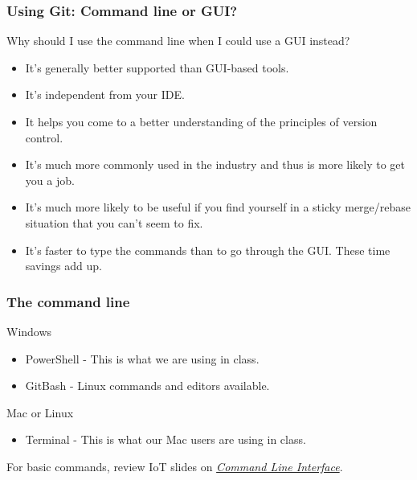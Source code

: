 \documentclass{beamer}
\begin{document}
\begin{frame}\frametitle{Using Git: Command line or GUI?}
Why should I use the command line when I could use a GUI instead?
\begin{itemize}
\item It's generally better supported than GUI-based tools.
\item It's independent from your IDE.
\item It helps you come to a better understanding of the principles of version control.
\item It's much more commonly used in the industry and thus is more likely to get you a job.
\item It's much more likely to be useful if you find yourself in a sticky merge/rebase situation that you can't seem to fix.
\item It’s faster to type the commands than to go through the GUI. These time savings add up.
\end{itemize}
\end{frame}

\begin{frame}\frametitle{The command line}
Windows
\begin{itemize}
\item PowerShell - \color{red}This is what we are using in class.\color{black}
\item GitBash - Linux commands and editors available.
\end{itemize}
\vspace{1cm}
Mac or Linux
\begin{itemize}
\item Terminal - \color{red}This is what our Mac users are using in class.\color{black}
\end{itemize}
\vspace{1cm}
For basic commands, review IoT slides on \hyperlink{commandlineinterface}{\emph{Command Line Interface}}.
\end{frame}

\end{document}
